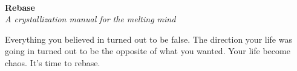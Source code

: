 \documentclass[a4paper,hidelinks]{article}
\begin{document}

~
\vspace{55px}

\begin{center}
{\Huge \textbf{
Rebase
}}\\
\vspace{10px}
\textit{
A crystallization manual for the melting mind
}
\end{center}

\vspace{70px}

\begin{center}
\end{center}

\thispagestyle{empty}

\newpage

\vspace*{\fill}
Everything you believed in turned out to be false. The direction your life was going in turned out to be the opposite of what you wanted. Your life become chaos. It's time to rebase.
\vspace*{\fill}

\restoregeometry
{}

\end{document}
